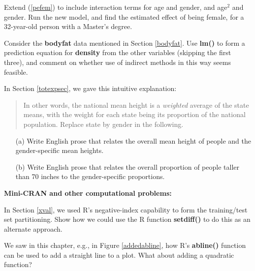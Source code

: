 \oneproblem
Extend (\ref{pefem}) to include interaction terms for age and gender,
and age$^{2}$ and gender.  Run the new model, and find the estimated
effect of being female, for a 32-year-old person with a Master's degree.

\oneproblem
Consider the {\bf bodyfat} data mentioned in Section \ref{bodyfat}.  Use
{\bf lm()} to form a prediction equation for {\bf density} from the
other variables (skipping the first three), and comment on whether use
of indirect methods in this way seems feasible.

\oneproblem
In Section \ref{totexpsec}, we gave this intuitive explanation:

\begin{quote}

In other words, the national mean height is a {\it weighted} average of
the state means, with the weight for each state being its proportion of
the national population.   Replace state by gender in the following.

\end{quote}

\begin{itemize}

\item [(a)]  Write English prose that relates the overall mean height of
people and the gender-specific mean heights.

\item [(b)]  Write English prose that relates the overall proportion of
people taller than 70 inches to the gender-specific proportions.

\end{itemize}

{\bf Mini-CRAN and other computational problems:}

\oneproblem
In Section \ref{xval}, we used R's negative-index capability to form 
the training/test set partitioning.  Show how we could use the R 
function {\bf setdiff()} to do this as an alternate approach.  

\oneproblem
We saw in this chapter, e.g., in Figure \ref{addedabline}, how R's 
{\bf abline()} function can be used to add a straight line to a plot.
What about adding a quadratic function?

